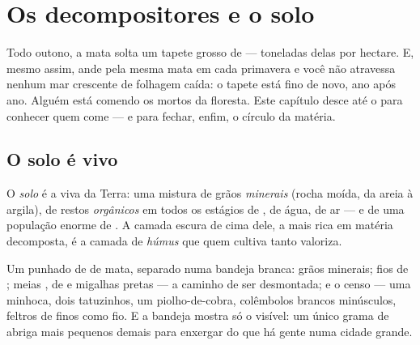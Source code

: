 \chapter{Os decompositores e o solo}\label{ch:g6:decomposers-and-soil}

Todo outono, a mata solta um tapete grosso de  --- toneladas
delas por hectare. E, mesmo assim, ande pela mesma mata em cada
primavera e você não atravessa nenhum mar crescente de folhagem
caída: o tapete está fino de novo, ano após ano. Alguém está comendo
os mortos da floresta. Este capítulo desce até o  para conhecer
quem come --- e para fechar, enfim, o círculo da matéria.

\section{O solo é vivo}

\begin{definition}[Solo]\label{def:g6:decomposers-and-soil:soil}
O \emph{solo} é a  viva da Terra: uma mistura de
grãos \emph{minerais} (rocha moída, da areia à argila), de restos
\emph{orgânicos} em todos os estágios de , de água, de ar
--- e de uma população enorme de . A camada escura de cima
dele, a mais rica em matéria decomposta, é a camada de
\emph{húmus} que quem cultiva tanto valoriza.
\end{definition}

\begin{example}\label{ex:g6:decomposers-and-soil:handful}
Um punhado de  de mata, separado numa bandeja branca: grãos
minerais; fios de ; meias ,  de  e migalhas
pretas ---  a caminho de ser desmontada; e o censo ---
uma minhoca, dois tatuzinhos, um piolho-de-cobra, colêmbolos brancos
minúsculos, feltros de  finos como fio. E a bandeja mostra só o
visível: um único grama de  abriga mais  pequenos
demais para enxergar do que há gente numa cidade grande.
\end{example}

